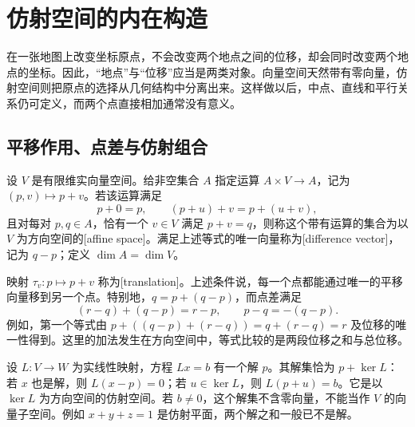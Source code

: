 
% 
% 

\section{仿射空间的内在构造}
\label{g1:sec:0101}

在一张地图上改变坐标原点，不会改变两个地点之间的位移，却会同时改变两个地点的坐标。因此，“地点”与“位移”应当是两类对象。向量空间天然带有零向量，仿射空间则把原点的选择从几何结构中分离出来。这样做以后，中点、直线和平行关系仍可定义，而两个点直接相加通常没有意义。

\subsection{平移作用、点差与仿射组合}
\label{g1:subsec:0101:01}

\begin{definition}[仿射空间]\label{g1:def:affine-space}
	设 \(V\) 是有限维实向量空间。给非空集合 \(A\) 指定运算 \(A\times V\rightarrow A\)，记为 \((p,v)\mapsto p+v\)。若该运算满足
	\[
		p+0=p,\qquad (p+u)+v=p+(u+v),
	\]
	且对每对 \(p,q\in A\)，恰有一个 \(v\in V\) 满足 \(p+v=q\)，则称这个带有运算的集合为以 \(V\) 为方向空间的[affine space]。满足上述等式的唯一向量称为[difference vector]，记为 \(q-p\)；定义 \(\dim A=\dim V\)。
\end{definition}

映射 \(\tau_v:p\mapsto p+v\) 称为[translation]。上述条件说，每一个点都能通过唯一的平移向量移到另一个点。特别地，\(q=p+(q-p)\)，而点差满足
\[
	(r-q)+(q-p)=r-p,\qquad p-q=-(q-p).
\]
例如，第一个等式由 \(p+((q-p)+(r-q))=q+(r-q)=r\) 及位移的唯一性得到。这里的加法发生在方向空间中，等式比较的是两段位移之和与总位移。

\begin{example}\label{g1:exm:affine-solutions}
	设 \(L:V\rightarrow W\) 为实线性映射，方程 \(Lx=b\) 有一个解 \(p\)。其解集恰为 \(p+\ker L\)：若 \(x\) 也是解，则 \(L(x-p)=0\)；若 \(u\in\ker L\)，则 \(L(p+u)=b\)。它是以 \(\ker L\) 为方向空间的仿射空间。若 \(b\ne0\)，这个解集不含零向量，不能当作 \(V\) 的向量子空间。例如 \(x+y+z=1\) 是仿射平面，两个解之和一般已不是解。
\end{example}

